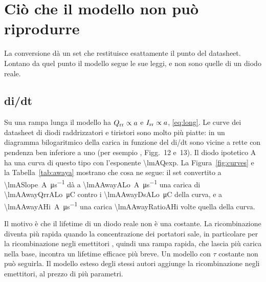 \documentclass[10pt,a4paper]{scrartcl}
\let\newcommand\lmitdefine
\newcommand{\Irr}{I_\mathrm{rr}}
\newcommand{\Qrr}{Q_\mathrm{rr}}
\begin{document}
\section{Ciò che il modello non può riprodurre}
\label{sec:limits}
La conversione dà un set che restituisce esattamente il punto del datasheet. Lontano da quel punto il modello segue le sue leggi, e non sono quelle di un diodo reale.

\subsection{di/dt}
\label{sec:slope}
Su una rampa lunga il modello ha $\Qrr \propto a$ e $\Irr \propto a$, \eqref{eq:long}. Le curve dei datasheet di diodi raddrizzatori e tiristori sono molto più piatte: in un diagramma bilogaritmico della carica in funzione del di/dt sono vicine a rette con pendenza ben inferiore a uno (per esempio \cite{an5950}, Figg.~12 e~13). Il diodo ipotetico A ha una curva di questo tipo con l'esponente \num{\lmAQexp}. La Figura~\ref{fig:curves} e la Tabella~\ref{tab:awaya} mostrano che cosa ne segue: il set convertito a \SI{\lmASlope}{\ampere\per\micro\second} dà a \SI{\lmAAwayALo}{\ampere\per\micro\second} una carica di \SI{\lmAAwayQrrALo}{\micro\coulomb} contro i \SI{\lmAAwayDsALo}{\micro\coulomb} della curva, e a \SI{\lmAAwayAHi}{\ampere\per\micro\second} una carica \num{\lmAAwayRatioAHi} volte quella della curva.

Il motivo è che il lifetime di un diodo reale non è una costante. La ricombinazione diventa più rapida quando la concentrazione dei portatori sale, in particolare per la ricombinazione negli emettitori \cite{schlangenotto1969}, quindi una rampa rapida, che lascia più carica nella base, incontra un lifetime efficace più breve. Un modello con $\tau$ costante non può seguirla. Il modello esteso degli stessi autori \cite{ma1993} aggiunge la ricombinazione negli emettitori, al prezzo di più parametri.
\end{document}
